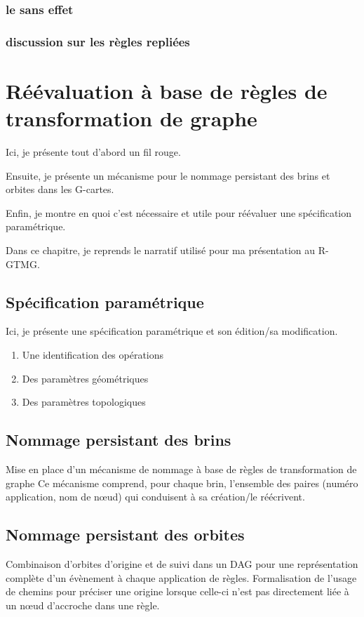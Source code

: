 \documentclass[11pt]{article}
\begin{document}
\subsubsection{le sans effet}
\label{sec:org22cc883}
\subsubsection{discussion sur les règles repliées}
\label{sec:org6b11c9c}
\section{Réévaluation à base de règles de transformation de graphe}
\label{sec:org18dd5b6}
Ici, je présente tout d'abord un fil rouge.

Ensuite, je présente un mécanisme pour le nommage persistant des brins et orbites dans les G-cartes.

Enfin, je montre en quoi c'est nécessaire et utile pour réévaluer une spécification paramétrique.

Dans ce chapitre, je reprends le narratif utilisé pour ma présentation au R-GTMG.
\subsection{Spécification paramétrique}
\label{sec:org50c0012}
Ici, je présente une spécification paramétrique et son édition/sa modification.
\begin{enumerate}
\item Une identification des opérations
\label{sec:org6e4f8dc}
\item Des paramètres géométriques
\label{sec:orgb137f14}
\item Des paramètres topologiques
\label{sec:orgee18448}
\end{enumerate}
\subsection{Nommage persistant des brins}
\label{sec:org77c5373}
Mise en place d'un mécanisme de nommage à base de règles de transformation de graphe
Ce mécanisme comprend, pour chaque brin, l'ensemble des paires (numéro application, nom de nœud) qui conduisent à sa création/le réécrivent.
\subsection{Nommage persistant des orbites}
\label{sec:org646300b}
Combinaison d'orbites d'origine et de suivi dans un DAG pour une représentation
complète d'un évènement à chaque application de règles. Formalisation de l'usage
de chemins pour préciser une origine lorsque celle-ci n'est pas directement liée
à un nœud d'accroche dans une règle.
\end{document}
